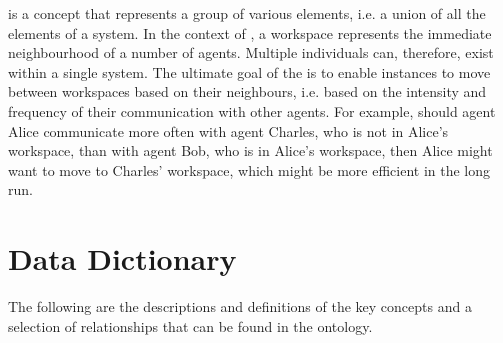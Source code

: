  is a concept that represents a group of various elements, i.e. a union of all the elements of a system. In the context of \magoontologyname, a workspace represents the immediate neighbourhood of a number of agents. Multiple  individuals can, therefore, exist within a single system. The ultimate goal of the \magoontologyname is to enable  instances to move between workspaces based on their neighbours, i.e. based on the intensity and frequency of their communication with other agents. For example, should agent Alice communicate more often with agent Charles, who is not in Alice's workspace, than with agent Bob, who is in Alice's workspace, then Alice might want to move to Charles' workspace, which might be more efficient in the long run.




\section{Data Dictionary}

The following are the descriptions and definitions of the 
%
key concepts and a selection of relationships
%
that can be found in the \magoontologyname ontology.

